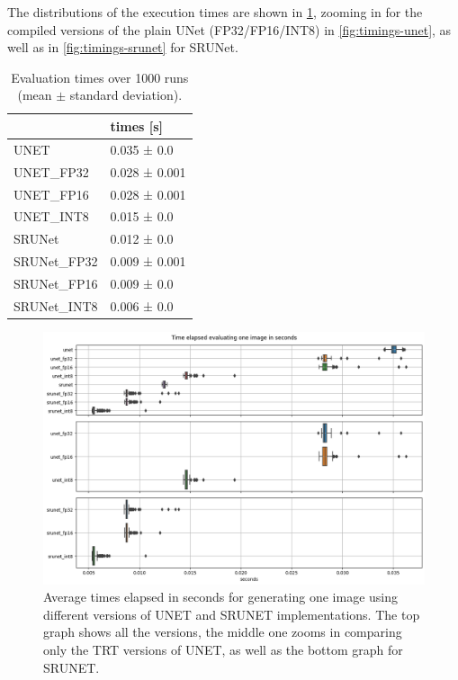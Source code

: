 The distributions of the execution times are shown in \cref{fig:timings-all}, zooming in for the compiled versions of the plain UNet (FP32/FP16/INT8) in \cref{fig:timings-unet}, as well as in \cref{fig:timings-srunet} for SRUNet.

\begin{table}[t]
\begin{tabular}{ll}
\toprule
{} &      times [s] \\
\midrule
UNET        &    0.035 ± 0.0 \\
UNET\_FP32   &  0.028 ± 0.001 \\
UNET\_FP16   &  0.028 ± 0.001 \\
UNET\_INT8   &    0.015 ± 0.0 \\
SRUNet      &    0.012 ± 0.0 \\
SRUNet\_FP32 &  0.009 ± 0.001 \\
SRUNet\_FP16 &    0.009 ± 0.0 \\
SRUNet\_INT8 &    0.006 ± 0.0 \\
\bottomrule
\end{tabular}
\caption{Evaluation times over 1000 runs (mean $\pm$ standard deviation).}
\label{tab:timings}
\end{table}

\begin{figure}[h]
\includegraphics[width=1.0\textwidth]{static/2023_03_02_boxplots_timings_all.png}
\caption{Average times elapsed in seconds for generating one image using different versions of UNET and SRUNET implementations. The top graph shows all the versions, the middle one zooms in comparing only the TRT versions of UNET, as well as the bottom graph for SRUNET.}
\label{fig:timings-all}
\end{figure}

